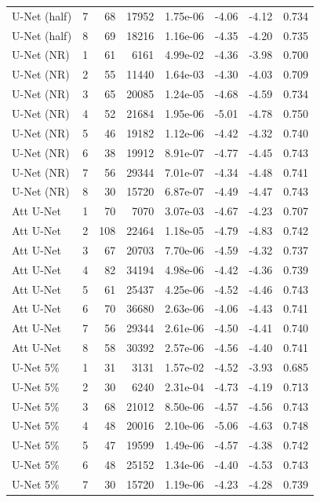 \begin{table}[htb]
{\begin{tabular}{@{}lrrrrrrr@{}}
U-Net (half) & 7 & 68 & 17952 & 1.75e-06 & -4.06 & -4.12 & 0.734 \\
U-Net (half) & 8 & 69 & 18216 & 1.16e-06 & -4.35 & -4.20 & 0.735 \\
\midrule
U-Net (NR) & 1 & 61 & 6161 & 4.99e-02 & -4.36 & -3.98 & 0.700 \\
U-Net (NR) & 2 & 55 & 11440 & 1.64e-03 & -4.30 & -4.03 & 0.709 \\
U-Net (NR) & 3 & 65 & 20085 & 1.24e-05 & -4.68 & -4.59 & 0.734 \\
U-Net (NR) & 4 & 52 & 21684 & 1.95e-06 & -5.01 & -4.78 & 0.750 \\
U-Net (NR) & 5 & 46 & 19182 & 1.12e-06 & -4.42 & -4.32 & 0.740 \\
U-Net (NR) & 6 & 38 & 19912 & 8.91e-07 & -4.77 & -4.45 & 0.743 \\
U-Net (NR) & 7 & 56 & 29344 & 7.01e-07 & -4.34 & -4.48 & 0.741 \\
U-Net (NR) & 8 & 30 & 15720 & 6.87e-07 & -4.49 & -4.47 & 0.743 \\
\midrule
Att U-Net & 1 & 70 & 7070 & 3.07e-03 & -4.67 & -4.23 & 0.707 \\
Att U-Net & 2 & 108 & 22464 & 1.18e-05 & -4.79 & -4.83 & 0.742 \\
Att U-Net & 3 & 67 & 20703 & 7.70e-06 & -4.59 & -4.32 & 0.737 \\
Att U-Net & 4 & 82 & 34194 & 4.98e-06 & -4.42 & -4.36 & 0.739 \\
Att U-Net & 5 & 61 & 25437 & 4.25e-06 & -4.52 & -4.46 & 0.743 \\
Att U-Net & 6 & 70 & 36680 & 2.63e-06 & -4.06 & -4.43 & 0.741 \\
Att U-Net & 7 & 56 & 29344 & 2.61e-06 & -4.50 & -4.41 & 0.740 \\
Att U-Net & 8 & 58 & 30392 & 2.57e-06 & -4.56 & -4.40 & 0.741 \\
\midrule
U-Net 5\% & 1 & 31 & 3131 & 1.57e-02 & -4.52 & -3.93 & 0.685 \\
U-Net 5\% & 2 & 30 & 6240 & 2.31e-04 & -4.73 & -4.19 & 0.713 \\
U-Net 5\% & 3 & 68 & 21012 & 8.50e-06 & -4.57 & -4.56 & 0.743 \\
U-Net 5\% & 4 & 48 & 20016 & 2.10e-06 & -5.06 & -4.63 & 0.748 \\
U-Net 5\% & 5 & 47 & 19599 & 1.49e-06 & -4.57 & -4.38 & 0.742 \\
U-Net 5\% & 6 & 48 & 25152 & 1.34e-06 & -4.40 & -4.53 & 0.743 \\
U-Net 5\% & 7 & 30 & 15720 & 1.19e-06 & -4.23 & -4.28 & 0.739 \\

\end{tabular}}
\end{table}
